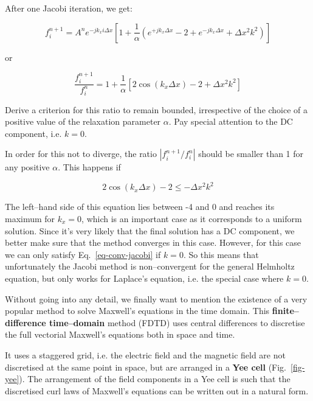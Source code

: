 After one Jacobi iteration, we get:

\begin{equation}
f_i^{n+1} = A^n e^{-j k_x i \Delta x} \left[{ 1 + \frac{1}{\alpha}\left(e^{+ j k_x  \Delta x} - 2+  e^{-j k_x  \Delta x} + \Delta x^2 k^2\right)}\right]
\end{equation} 

or

\begin{equation}
\frac{f_i^{n+1}}{f_i^{n}} =  1 + \frac{1}{\alpha}\left[2 \cos ( k_x  \Delta x) - 2 + \Delta x^2 k^2\right]
\end{equation} 

\begin{cue}
Derive a criterion for this ratio to remain bounded, irrespective of the choice of a positive value of the relaxation parameter $\alpha$. Pay special attention to the DC component, i.e. $k=0$. 
\end{cue}

In order for this not to diverge, the ratio  $|f_i^{n+1} / f_i^{n}|$ should be smaller than 1 for any positive $\alpha$. This happens if

\begin{equation}
2 \cos ( k_x  \Delta x) - 2 \le - \Delta x^2 k^2 \label{eq-conv-jacobi}
\end{equation} 

The left--hand side of this equation lies between -4 and 0 and reaches its maximum for $k_x=0$, which is an important case as it corresponds to a uniform solution. Since it's very likely that the final solution has a DC component, we better make sure that the method converges in this case. However, for this case we can only satisfy Eq.~\ref{eq-conv-jacobi} if $k=0$. So this means that unfortunately the Jacobi method is non--convergent for the general Helmholtz equation, but only works for Laplace's equation, i.e. the special case where $k=0$.

\pagebreak


Without going into any detail, we finally want to mention the existence of a very popular method to solve Maxwell's equations in the time domain. This \textbf{finite--difference time--domain} method (FDTD) uses central differences to discretise the full vectorial Maxwell's equations both in space and time.

It uses a staggered grid, i.e. the electric field and the magnetic field are not discretised at the same point in space, but are arranged in a \textbf{Yee cell} (Fig.~\ref{fig-yee}). The arrangement of the field components in a Yee cell is such that the discretised curl laws of Maxwell's equations can be written out in a natural form.

